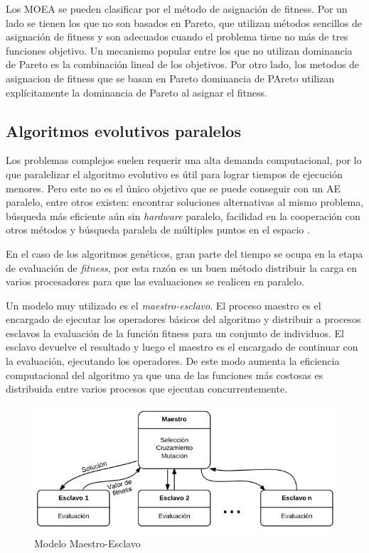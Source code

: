 Los MOEA se pueden clasificar por el método de asignación de fitness. Por un lado se tienen los que no son basados en Pareto, que utilizan métodos sencillos de asignación de fitness y son adecuados cuando el problema tiene no más de tres funciones objetivo. Un mecanismo popular entre los que no utilizan dominancia de Pareto es la combinación lineal de los objetivos. Por otro lado, los metodos de asignacion de fitness que se basan en Pareto dominancia de PAreto utilizan explícitamente la dominancia de Pareto al asignar el fitness.




\subsection{Algoritmos evolutivos paralelos}
Los problemas complejos suelen requerir una alta demanda computacional, por lo que paralelizar el algoritmo evolutivo es útil para lograr tiempos de ejecución menores. Pero este no es el único objetivo que se puede conseguir con un AE paralelo, entre otros existen: encontrar soluciones alternativas al mismo problema, búsqueda más eficiente aún sin \emph{hardware} paralelo, facilidad en la cooperación con otros métodos y búsqueda paralela de múltiples puntos en el espacio \citep{Alba2002}. 

En el caso de los algoritmos genéticos, gran parte del tiempo se ocupa en la etapa de evaluación de \emph{fitness}, por esta razón es un buen método distribuir la carga en varios procesadores para que las evaluaciones se realicen en paralelo. 

Un modelo muy utilizado es el \emph{maestro-esclavo}. El proceso maestro es el encargado de ejecutar los operadores básicos del algoritmo y distribuir a procesos esclavos la evaluación de la función fitness para un conjunto de individuos. El esclavo devuelve el resultado y luego el maestro es el encargado de continuar con la evaluación, ejecutando los operadores. De este modo aumenta la eficiencia computacional del algoritmo ya que una de las funciones más costosas es distribuida entre varios procesos que ejecutan concurrentemente.

\begin{figure}[H]
	\centering
	\includegraphics[width=0.9\linewidth]{Figures/diagrama-master-slave}
	\caption[Modelo Maestro-Esclavo]{Modelo Maestro-Esclavo}
	\label{fig:diagrama-master-slave}
\end{figure}

